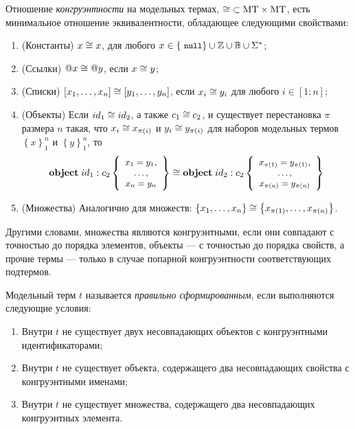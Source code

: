 \begin{Def}
Отношение \emph{конгруэнтности} на модельных термах, \mbox{$\cong \;\subset \mbox{MT} \times \mbox{MT}$}, есть минимальное отношение эквивалентности, обладающее следующими свойствами:
\begin{enumerate}
\item (Константы) $x \cong x$, для любого $x \in \left\{\ \mbox{\small \tt null} \right\} \cup \mathbb{Z} \cup \mathbb{B} \cup \Sigma^{*}$;
\item (Ссылки) $@x \cong @y$, если $x \cong y$;
\item (Списки) $\left[x_1, \ldots, x_n\right] \cong \left[y_1, \ldots, y_n\right]$, если $x_i \cong y_i$ для любого $i \in [1; n]$;
\item (Объекты) Если $id_1 \cong id_2$, а также $c_1 \cong c_2$, и существует перестановка $\pi$ размера $n$ такая, что $x_i \cong x_{\pi(i)}$ и $y_i \cong y_{\pi(i)}$ для наборов модельных термов $\left\{ x \right\}_1^n$ и $\left\{ y \right\}_1^n$, то 
$$ 
\mathbf{object}\;id_1 : c_2 \left\{ 
	\mbox{\small$\begin{array}{c}
		x_1=y_1,\\ 
		\ldots,\\ 
		x_n=y_n
	\end{array}$}
 \right\} \cong \mathbf{object}\;id_2 : c_2 \left\{ 
	\mbox{\small$\begin{array}{c}
		x_{\pi(1)}=y_{\pi(1)},\\
		\ldots,\\
		x_{\pi(n)}=y_{\pi(n)}	
	\end{array}$}
 \right\}
$$
\item (Множества) Аналогично для множеств: $\left\{x_1, \ldots, x_n\right\} \cong \left\{x_{\pi(1)}, \ldots, x_{\pi(n)}\right\}$.
\end{enumerate}
\end{Def}

Другими словами, множества являются конгруэнтными, если они совпадают с точностью до порядка элементов, объекты --- с точностью до порядка свойств, а прочие термы --- только в случае попарной конгруэнтности соответствующих подтермов.
\begin{Def}
Модельный терм $t$ называется \emph{правильно сформированным}, если выполняются следующие условия:
\begin{enumerate}
\item Внутри $t$ не существует двух несовпадающих объектов с конгруэнтными идентификаторами;
\item Внутри $t$ не существует объекта, содержащего два несовпадающих свойства с конгруэнтными именами;
\item Внутри $t$ не существует множества, содержащего два несовпадающих конгруэнтных элемента.
\end{enumerate}
\end{Def}

